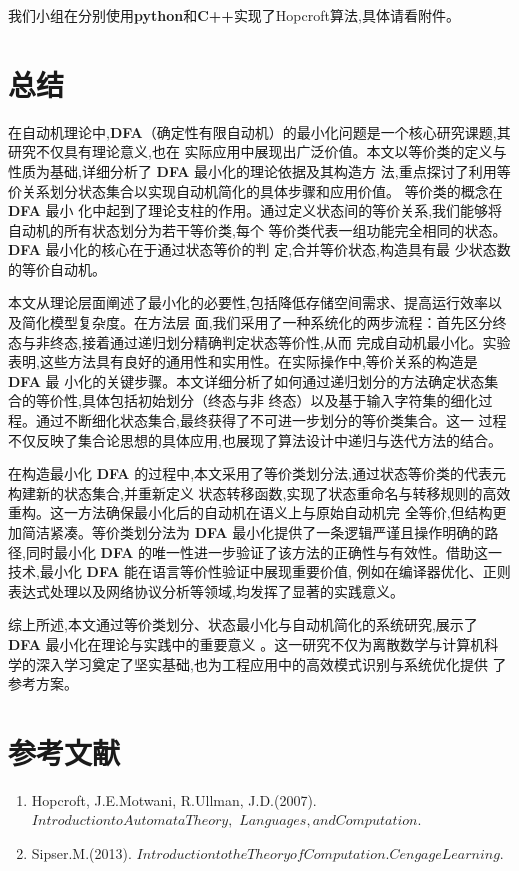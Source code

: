 \documentclass[UTF8]{ctexart}
\begin{document}
	我们小组在分别使用\textbf{python}和\textbf{C++}实现了Hopcroft算法,具体请看附件。
	
	\newpage
	\section{总结}
	
	在自动机理论中,\textbf{DFA}（确定性有限自动机）的最小化问题是一个核心研究课题,其研究不仅具有理论意义,也在
	实际应用中展现出广泛价值。本文以等价类的定义与性质为基础,详细分析了 \textbf{DFA} 最小化的理论依据及其构造方
	法,重点探讨了利用等价关系划分状态集合以实现自动机简化的具体步骤和应用价值。 等价类的概念在 \textbf{DFA} 最小
	化中起到了理论支柱的作用。通过定义状态间的等价关系,我们能够将自动机的所有状态划分为若干等价类,每个
	等价类代表一组功能完全相同的状态。\textbf{DFA} 最小化的核心在于通过状态等价的判 定,合并等价状态,构造具有最
	少状态数的等价自动机。
	
	本文从理论层面阐述了最小化的必要性,包括降低存储空间需求、提高运行效率以及简化模型复杂度。在方法层
	面,我们采用了一种系统化的两步流程：首先区分终态与非终态,接着通过递归划分精确判定状态等价性,从而
	完成自动机最小化。实验表明,这些方法具有良好的通用性和实用性。在实际操作中,等价关系的构造是 \textbf{DFA} 最
	小化的关键步骤。本文详细分析了如何通过递归划分的方法确定状态集合的等价性,具体包括初始划分（终态与非
	终态）以及基于输入字符集的细化过程。通过不断细化状态集合,最终获得了不可进一步划分的等价类集合。这一
	过程不仅反映了集合论思想的具体应用,也展现了算法设计中递归与迭代方法的结合。
	
	在构造最小化 \textbf{DFA} 的过程中,本文采用了等价类划分法,通过状态等价类的代表元构建新的状态集合,并重新定义
	状态转移函数,实现了状态重命名与转移规则的高效重构。这一方法确保最小化后的自动机在语义上与原始自动机完
	全等价,但结构更加简洁紧凑。等价类划分法为 \textbf{DFA} 最小化提供了一条逻辑严谨且操作明确的路径,同时最小化 \textbf{DFA}
	的唯一性进一步验证了该方法的正确性与有效性。借助这一技术,最小化 \textbf{DFA} 能在语言等价性验证中展现重要价值,
	例如在编译器优化、正则表达式处理以及网络协议分析等领域,均发挥了显著的实践意义。
	
	综上所述,本文通过等价类划分、状态最小化与自动机简化的系统研究,展示了 \textbf{DFA} 最小化在理论与实践中的重要意义
	。这一研究不仅为离散数学与计算机科学的深入学习奠定了坚实基础,也为工程应用中的高效模式识别与系统优化提供
	了参考方案。
	
	
	\newpage
	\section{参考文献}
	\begin{enumerate}
		\item Hopcroft, J.E.Motwani, R.Ullman, J.D.(2007). $Introduction to Automata Theory,$ \newline$Languages, and Computation.$
		\item Sipser.M.(2013). $Introduction to the Theory of Computation. Cengage Learning.$
	\end{enumerate}
	
	
\end{document}
